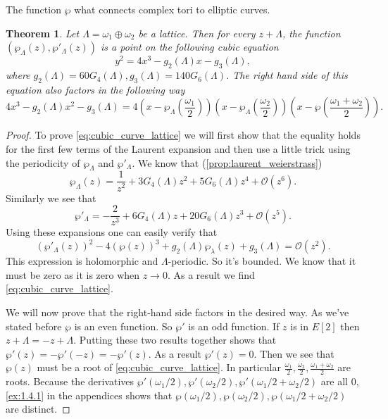 \documentclass[titlepage,a4paper]{article}
\theoremstyle{theoremdd}
\newtheorem{theorem}{Theorem}[section]
\theoremstyle{definitiondd}
\theoremstyle{remarkdd}
\begin{document}
The function $\wp$ what connects complex tori to elliptic curves. 
\begin{theorem}\label{thm:complex_tori_elliptic_curves}
	Let $\Lambda = \omega_1 \oplus \omega_2$ be a lattice. Then for every $z + \Lambda$, the function  $(\wp_\Lambda(z), \wp'_\Lambda(z))$ is a point on the following cubic equation \begin{equation} \label{eq:cubic_curve_lattice}
		y^2 = 4x^3 - g_2(\Lambda)x - g_{3}(\Lambda)
	,\end{equation}
	where $g_2(\Lambda) = 60 G_4(\Lambda), g_3(\Lambda) = 140 G_6(\Lambda)$.
	The right hand side of this equation also factors in the following way \[
		4x^3 - g_2(\Lambda) x^2 - g_3(\Lambda) = 4\left(x - \wp_\Lambda\left(\frac{\omega_1}{2}\right)\right)\left(x - \wp_{\Lambda}\left(\frac{\omega_2}{2}\right)\right)\left(x - \wp\left(\frac{\omega_1 + \omega_2}{2}\right)\right)
	.\] 
\end{theorem}
\begin{proof}
	To prove \cref{eq:cubic_curve_lattice} we will first show that the equality holds for the first few terms of the Laurent expansion and then use a little trick using the periodicity of $\wp_\Lambda$ and $\wp'_\Lambda$.
	We know that (\cref{prop:laurent_weierstrass})\[
		\wp_\Lambda(z) = \frac{1}{z^2} + 3 G_4(\Lambda) z^2 + 5G_6(\Lambda) z^{4} + \mathcal{O} (z^{6})
	.\] 
	Similarly we see that \[
		\wp'_\Lambda = - \frac{2}{z^3} + 6 G_4(\Lambda)z + 20G_6(\Lambda)z^3 + \mathcal{O} (z^{5})	
	.\] 
	Using these expansions one can easily verify that \[
		(\wp'_\Lambda(z))^2 - 4(\wp(z))^3 + g_2(\Lambda)\wp_{\lambda}(z) + g_{3}(\Lambda)    = \mathcal{O} (z^{2})
	.\] 
	This expression is holomorphic and $\Lambda$-periodic. So it's bounded. We know that it must be zero as it is zero when  $z \to 0$. 
	As a result we find \cref{eq:cubic_curve_lattice}.

	We will now prove that the right-hand side factors in the desired way.
	As we've stated before $\wp$ is an even function. So $\wp'$ is an odd function. 
	If $z$ is in $E[2]$ then  $z + \Lambda = - z + \Lambda$. 
	Putting these two results together shows that $\wp'(z) = - \wp'(-z) = -\wp'(z)$.  
	As a result $\wp'(z) = 0$.
	Then we see that $\wp(z)$ must be a root of \cref{eq:cubic_curve_lattice}. 
	In particular  $\frac{\omega_1}{2}, \frac{\omega_2}{2}, \frac{\omega_1 + \omega_2}{2}$ are roots. 
	Because the derivatives $\wp'(\omega_1 / 2 ), \wp'(\omega_2 / 2), \wp'(\omega_1 / 2 + \omega_2 /2)$ are all $0$, \cref{ex:1.4.1} in the appendices shows that $\wp(\omega_1 / 2), \wp(\omega_2 / 2), \wp(\omega_1 / 2 + \omega_2 / 2)$ are distinct.
\end{proof}
\end{document}
